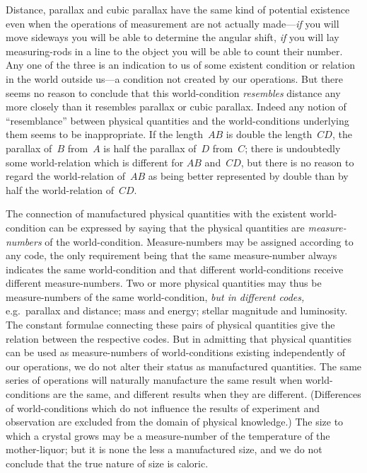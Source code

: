 \documentclass[12pt]{book}
\begin{document}
Distance, parallax and cubic parallax have the same kind of potential
existence even when the operations of measurement are not actually made---\emph{if}
you will move sideways you will be able to determine the angular shift, \emph{if}
you will lay measuring\hyp{}rods in a line to the object you will be able to count
their number. Any one of the three is an indication to us of some existent
condition or relation in the world outside us---a condition not created by our
operations. But there seems no reason to conclude that this world\hyp{}condition
\emph{resembles} distance any more closely than it resembles parallax or cubic
parallax. Indeed any notion of ``resemblance'' between physical quantities
and the world\hyp{}conditions underlying them seems to be inappropriate. If the
length~$AB$ is double the length~$CD$, the parallax of~$B$ from~$A$ is half the parallax
of~$D$ from~$C$; there is undoubtedly some world\hyp{}relation which is different
for $AB$ and~$CD$, but there is no reason to regard the world\hyp{}relation of~$AB$ as
being better represented by double than by half the world\hyp{}relation of~$CD$.

The connection of manufactured physical quantities with the existent
world\hyp{}condition can be expressed by saying that the physical quantities are
\emph{measure\hyp{}numbers} of the world\hyp{}condition. Measure\hyp{}numbers may be assigned
%
according to any code, the only requirement being that the same measure\hyp{}number
always indicates the same world\hyp{}condition and that different world\hyp{}conditions
receive different measure\hyp{}numbers. Two or more physical quantities
may thus be measure\hyp{}numbers of the same world\hyp{}condition, \emph{but in different
codes,} e.g.\ parallax and distance; mass and energy; stellar magnitude and luminosity.
The constant formulae connecting these pairs of physical quantities
give the relation between the respective codes. But in admitting that physical
quantities can be used as measure\hyp{}numbers of world\hyp{}conditions existing
independently of our operations, we do not alter their status as manufactured
quantities. The same series of operations will naturally manufacture the
same result when world\hyp{}conditions are the same, and different results when
they are different. (Differences of world\hyp{}conditions which do not influence
the results of experiment and observation are  excluded from the
domain of physical knowledge.) The size to which a crystal grows may be a
measure\hyp{}number of the temperature of the mother\hyp{}liquor; but it is none the
less a manufactured size, and we do not conclude that the true nature of size
is caloric.
\end{document}
